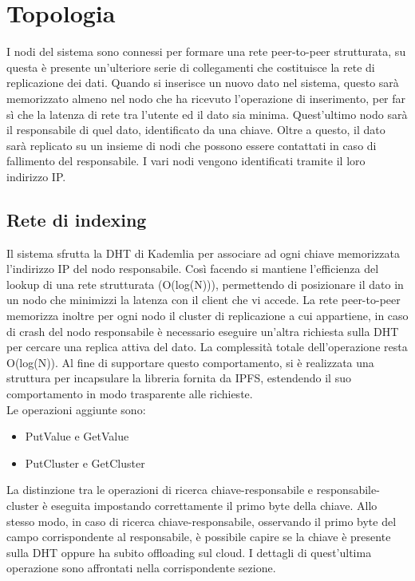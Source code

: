 \documentclass[conference]{IEEEtran}
\begin{document}
\section{Topologia}
I nodi del sistema sono connessi per formare una rete peer-to-peer strutturata, su questa è presente un'ulteriore serie di collegamenti
che costituisce la rete di replicazione dei dati. Quando si inserisce un nuovo dato nel sistema, questo sarà memorizzato
almeno nel nodo che ha ricevuto l'operazione di inserimento, per far sì che la latenza di rete tra l'utente ed il dato sia minima.
Quest'ultimo nodo sarà il responsabile di quel dato, identificato da una chiave. Oltre a questo, il dato sarà replicato
su un insieme di nodi che possono essere contattati in caso di fallimento del responsabile.
I vari nodi vengono identificati tramite il loro indirizzo IP.

\subsection{Rete di indexing}
Il sistema sfrutta la DHT di Kademlia per associare ad ogni chiave memorizzata l'indirizzo IP del nodo responsabile.
Così facendo si mantiene l'efficienza del lookup di una rete strutturata (O(log(N))), permettendo di posizionare
il dato in un nodo che minimizzi la latenza con il client che vi accede. La rete peer-to-peer memorizza inoltre per ogni
nodo il cluster di replicazione a cui appartiene, in caso di crash del nodo responsabile è necessario eseguire un'altra richiesta sulla
DHT per cercare una replica attiva del dato. La complessità totale dell'operazione resta O(log(N)).
Al fine di supportare questo comportamento, si è realizzata una struttura per incapsulare la libreria fornita da IPFS,
estendendo il suo comportamento in modo trasparente alle richieste.\\
Le operazioni aggiunte sono:
\begin{itemize}
  \item {PutValue e GetValue}
  \item {PutCluster e GetCluster}
\end{itemize}
La distinzione tra le operazioni di ricerca chiave-responsabile e responsabile-cluster è eseguita impostando correttamente
il primo byte della chiave.
Allo stesso modo, in caso di ricerca chiave-responsabile, osservando il primo byte del campo corrispondente al responsabile,
è possibile capire se la chiave è presente sulla DHT oppure ha subito offloading sul cloud. I dettagli di quest'ultima
operazione sono affrontati nella corrispondente sezione.
\end{document}
